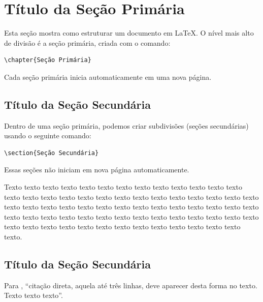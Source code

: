 
\chapter{Título da Seção Primária}

Esta seção mostra como estruturar um documento em LaTeX.  
O nível mais alto de divisão é a seção primária, criada com o comando:

\begin{verbatim}
\chapter{Seção Primária}
\end{verbatim}

Cada seção primária inicia automaticamente em uma nova página.


\section{Título da Seção Secundária}

Dentro de uma seção primária, podemos criar subdivisões (seções secundárias) usando o seguinte comando:

\begin{verbatim}
\section{Seção Secundária}
\end{verbatim}

Essas seções não iniciam em nova página automaticamente.

Texto texto texto texto texto texto texto texto texto texto texto texto texto texto texto texto texto texto texto texto texto texto texto texto texto texto texto texto texto texto texto texto texto texto texto texto texto texto texto texto texto texto texto texto texto texto texto texto texto texto texto texto texto texto texto texto texto texto texto texto texto texto texto texto texto texto texto texto texto.

\section{Título da Seção Secundária}

Para \cite{ciclano}, ``citação direta, aquela até três linhas, deve aparecer desta forma no texto. Texto texto texto''.

